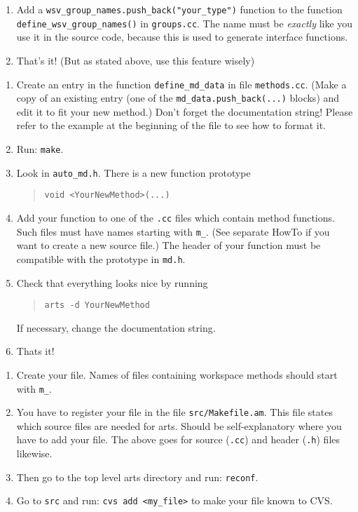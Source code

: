 \begin{enumerate}
\item Add a \verb|wsv_group_names.push_back("your_type")| function to
  the function \verb|define_wsv_group_names()| in \verb|groups.cc|. The
  name must be \emph{exactly} like you use it in the source code,
  because this is used to generate interface functions.
\item That's it! (But as stated above, use this feature wisely)
\end{enumerate}



\begin{enumerate}
\item Create an entry in the function \verb|define_md_data| in file
  \verb|methods.cc|.  (Make a copy of an existing entry (one of the
  \verb|md_data.push_back(...)| blocks) and edit it to fit your new
  method.) Don't forget the documentation string! Please refer to the
  example at the beginning of the file to see how to format it.
\item Run:
  \verb|make|.
\item Look in \verb|auto_md.h|. There is a new function prototype
  \begin{quote}
    \verb|void <YourNewMethod>(...)|
  \end{quote}
\item Add your function to one of the \verb|.cc| files which contain method
  functions. Such files must have names starting with \verb|m_|. (See
  separate HowTo if you want to create a new source file.) The header
  of your function must be compatible with the prototype in \verb|md.h|.
\item Check that everything looks nice by running 
  \begin{quote}
    \verb|arts -d YourNewMethod|
  \end{quote}
  If necessary, change the documentation string.

\item Thats it!
\end{enumerate}


\begin{enumerate}
\item Create your file. Names of files containing workspace methods should
  start with \verb|m_|.
\item You have to register your file in the file \verb|src/Makefile.am|.
  This file states which source files are needed for arts. Should be
  self-explanatory where you have to add your file. The above goes for
  source (\verb|.cc|) and header (\verb|.h|) files likewise.
\item Then go to the top level arts directory and run: \verb|reconf|.
\item Go to \verb|src| and run: \verb|cvs add <my_file>| to make your
  file known to CVS.
\end{enumerate}


